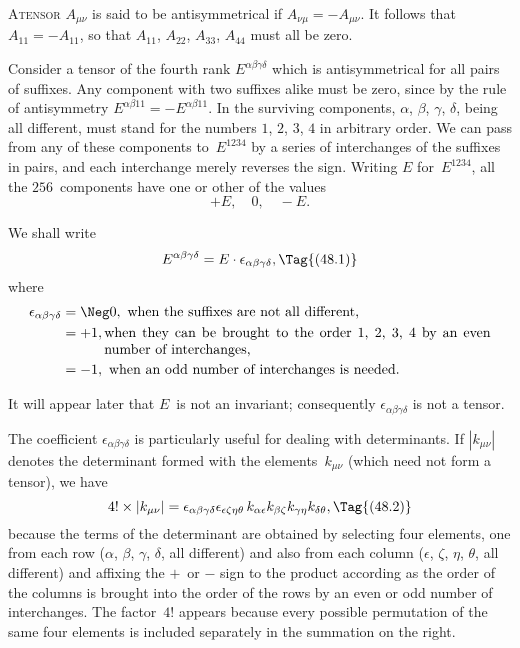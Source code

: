 \documentclass[12pt]{book}
\begin{document}
%

\lettrine{\textcolor{lettrinecolour}{A}}{tensor} $A_{\mu\nu}$ is said to be antisymmetrical if $A_{\nu\mu} = -A_{\mu\nu}$.
It follows that $A_{11} = -A_{11}$, so that $A_{11}$, $A_{22}$, $A_{33}$, $A_{44}$ must all be zero.

Consider a tensor of the fourth rank $E^{\alpha\beta\gamma\delta}$ which is antisymmetrical for
all pairs of suffixes. Any component with two suffixes alike must be zero,
since by the rule of antisymmetry $E^{\alpha\beta11} = -E^{\alpha\beta11}$. In the surviving components,
$\alpha$, $\beta$, $\gamma$, $\delta$, being all different, must stand for the numbers $1$, $2$, $3$, $4$
in arbitrary order. We can pass from any of these components to~$E^{1234}$ by a
series of interchanges of the suffixes in pairs, and each interchange merely
reverses the sign. Writing $E$ for~$E^{1234}$, all the $256$~components have one or
other of the values
\[
+E,\quad 0,\quad -E.
\]

We shall write
\[
E^{\alpha\beta\gamma\delta} = E \cdot \epsilon_{\alpha\beta\gamma\delta},
\Tag{(48.1)}
\]
where
\begin{align*}
  \epsilon_{\alpha\beta\gamma\delta}
  &= \Neg0, \text{ when the suffixes are not all different,} \\
  &= +1, \parbox[t]{0.8\textwidth}{ when they can be brought to the order $1$, $2$, $3$, $4$ by an even
    number of interchanges,} \\
  &= -1, \text{ when an odd number of interchanges is needed.}
\end{align*}

It will appear later that $E$~is not an invariant; consequently $\epsilon_{\alpha\beta\gamma\delta}$ is not
a tensor.

The coefficient $\epsilon_{\alpha\beta\gamma\delta}$ is particularly useful for dealing with determinants.
If $|k_{\mu\nu}|$ denotes the determinant formed with the elements~$k_{\mu\nu}$ (which need
%
not form a tensor), we have
\[
4! \times |k_{\mu\nu}| = \epsilon_{\alpha\beta\gamma\delta} \epsilon_{\epsilon\zeta\eta\theta}\, k_{\alpha\epsilon} k_{\beta\zeta} k_{\gamma\eta} k_{\delta\theta},
\Tag{(48.2)}
\]
because the terms of the determinant are obtained by selecting four elements,
one from each row ($\alpha$, $\beta$, $\gamma$, $\delta$, all different) and also from each column ($\epsilon$, $\zeta$, $\eta$, $\theta$,
all different) and affixing the $+$~or $-$ sign to the product according as the
order of the columns is brought into the order of the rows by an even or odd
number of interchanges. The factor~$4!$ appears because every possible permutation
of the same four elements is included separately in the summation
on the right.
\end{document}
